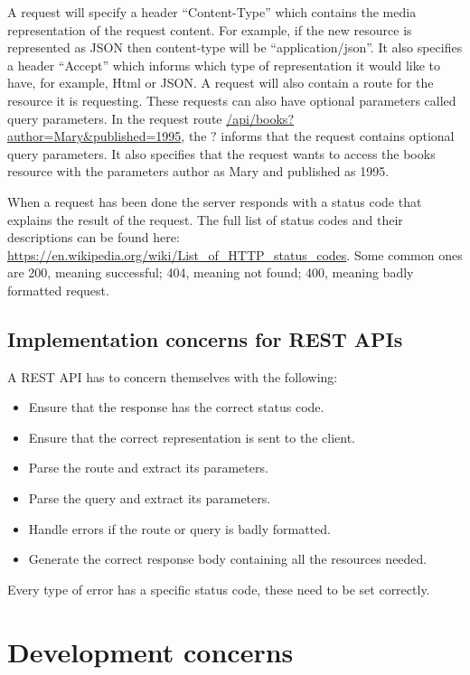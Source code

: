 A request will specify a header ``Content-Type'' which contains the media
representation of the request content. For example, if the new resource is
represented as JSON then content-type will be ``application/json''. It also
specifies a header ``Accept'' which informs which type of representation it
would like to have, for example, Html or JSON.  A request will also contain a
route for the resource it is requesting. These requests can also have optional
parameters called query parameters. In the request route
\url{/api/books?author=Mary&published=1995}, the $?$ informs that the request
contains optional query parameters.  It also specifies that the
request wants to access the books resource with the parameters author as Mary
and published as 1995.

When a request has been done the server responds with a status code that
explains the result of the request. The full list of status codes and their
descriptions can be found here:
\url{https://en.wikipedia.org/wiki/List_of_HTTP_status_codes}. Some common ones
are 200, meaning successful; 404, meaning not found; 400, meaning badly
formatted request.

\subsection{Implementation concerns for REST APIs}

A REST API has to concern themselves with the following:

\begin{itemize}
\item Ensure that the response has the correct status code.
\item Ensure that the correct representation is sent to the client.
\item Parse the route and extract its parameters. 
\item Parse the query and extract its parameters.
\item Handle errors if the route or query is badly formatted.
\item Generate the correct response body containing all the resources needed.
\end{itemize}

Every type of error has a specific status code, these need to be set correctly.

\section{Development concerns} 

